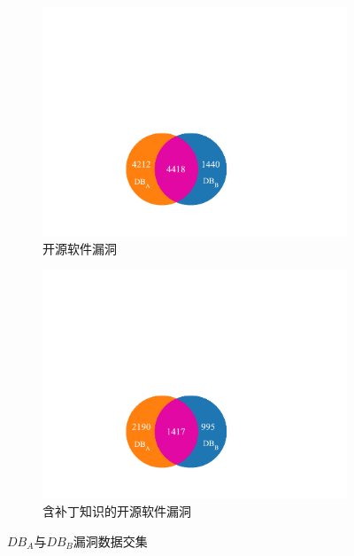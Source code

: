 \begin{figure}[t]
    \centering
    \begin{subfigure}[b]{0.45\textwidth}
    \centering
    \includegraphics[scale=0.98]{fig/rq1-CVE-IDs-VS.pdf}
    \caption{开源软件漏洞}\label{fig:rq1-cves}
    \end{subfigure}
    \begin{subfigure}[b]{0.45\textwidth}
    \centering
    \includegraphics[scale=0.98]{fig/rq1-CVE-IDs-Patches-VS.pdf}
    \caption{含补丁知识的开源软件漏洞}\label{fig:rq1-cves-with-patches}
    \end{subfigure}
    \caption{$DB_A$与$DB_B$漏洞数据交集}\label{fig:intersection}
\end{figure}


